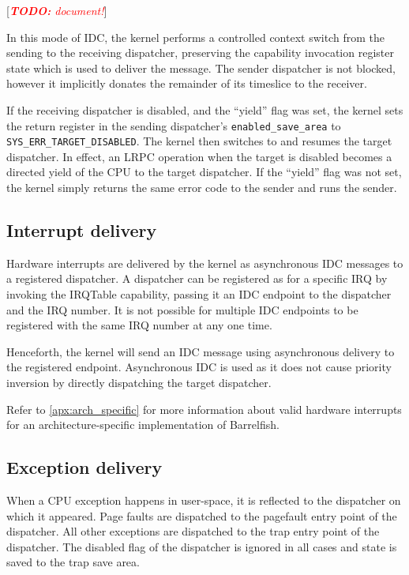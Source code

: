\documentclass{scrreprt}
\newcommand{\note}[1]{ [\textcolor{red}{\emph{#1}}]}
\newcommand{\todo}[1]{\note{\textbf{TODO:} #1}}
\begin{document}
  \todo{document!}

  In this mode of IDC, the kernel performs a controlled
  context switch from the sending to the receiving dispatcher,
  preserving the capability invocation register state which is used to
  deliver the message. The sender dispatcher is not blocked, however
  it implicitly donates the remainder of its timeslice to the
  receiver.

  If the receiving dispatcher is disabled, and the ``yield'' flag was set,
  the kernel sets the return
  register in the sending dispatcher's \lstinline+enabled_save_area+
  to \lstinline+SYS_ERR_TARGET_DISABLED+. The kernel then switches to
  and resumes the target dispatcher. In effect, an LRPC
  operation when the target is disabled becomes a directed yield of
  the CPU to the target dispatcher. If the ``yield'' flag was not set,
  the kernel simply returns the same error code to the sender and runs the
  sender.

  \subsection{Interrupt delivery}\label{sec:interrupts}

  Hardware interrupts are delivered by the kernel as asynchronous IDC
  messages to a registered dispatcher. A dispatcher can be registered
  as for a specific IRQ by invoking the IRQTable capability,
  passing it an IDC endpoint to the dispatcher and the IRQ
  number. It is not possible for multiple IDC endpoints to be
  registered with the same IRQ number at any one time.

  Henceforth, the kernel will send an IDC message using asynchronous
  delivery to the registered endpoint. Asynchronous
  IDC is used as it does not cause priority inversion by directly
  dispatching the target dispatcher.

  Refer to \autoref{apx:arch_specific} for more information about
  valid hardware interrupts for an architecture-specific
  implementation of Barrelfish.

  \subsection{Exception delivery}

  When a CPU exception happens in user-space, it is reflected to the
  dispatcher on which it appeared. Page
  faults are dispatched to the pagefault entry point of the
  dispatcher. All other exceptions are dispatched to the trap entry
  point of the dispatcher. The disabled flag of the dispatcher is
  ignored in all cases and state is saved to the trap save area.
\end{document}
